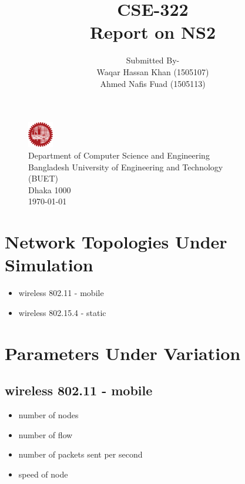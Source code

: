\documentclass[12pt]{article}
\title{
	\Large{CSE-322}\\
	\Large{Report on NS2}
	\endgraf\bigskip
}
\author{
    \Large{Submitted By-}\\
	\Large{Waqar Hassan Khan (1505107)}\\
	\Large{Ahmed Nafis Fuad (1505113)}\\
}
\date{}
\begin{document}
\maketitle

\section*{}
\begin{figure}[h]
	\centering
	
	\captionsetup{justification=centering}
	\includegraphics[width = 0.1\textwidth]{image/buet.png}
	\caption*{
		\Large{Department of Computer Science and Engineering}
		\\
		\Large{Bangladesh University of Engineering and Technology}
		\\
		\Large{(BUET)}
		\\
		\Large{Dhaka 1000}
		\\
		\Large{\today}
	}
	
\end{figure}

\newpage
\tableofcontents
\newpage



\section{Network Topologies Under Simulation}
\begin{itemize}
	\item wireless 802.11 - mobile
	\item wireless 802.15.4 - static
\end{itemize}

\section{Parameters Under Variation}
\subsection{wireless 802.11 - mobile}
\begin{itemize}
	\item number of nodes
	\item number of flow
	\item number of packets sent per second
	\item speed of node
\end{itemize}
\end{document}
